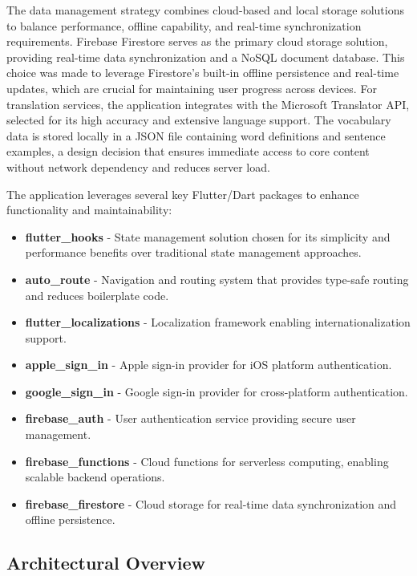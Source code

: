 The data management strategy combines cloud-based and local storage solutions to balance performance, offline capability, and real-time synchronization requirements. Firebase Firestore serves as the primary cloud storage solution, providing real-time data synchronization and a NoSQL document database. This choice was made to leverage Firestore's built-in offline persistence and real-time updates, which are crucial for maintaining user progress across devices. For translation services, the application integrates with the Microsoft Translator API, selected for its high accuracy and extensive language support. The vocabulary data is stored locally in a JSON file containing word definitions and sentence examples, a design decision that ensures immediate access to core content without network dependency and reduces server load.

The application leverages several key Flutter/Dart packages to enhance functionality and maintainability:
\begin{itemize}
    \item \textbf{flutter\_hooks} - State management solution chosen for its simplicity and performance benefits over traditional state management approaches.
    \item \textbf{auto\_route} - Navigation and routing system that provides type-safe routing and reduces boilerplate code.
    \item \textbf{flutter\_localizations} - Localization framework enabling internationalization support.
    \item \textbf{apple\_sign\_in} - Apple sign-in provider for iOS platform authentication.
    \item \textbf{google\_sign\_in} - Google sign-in provider for cross-platform authentication.
    \item \textbf{firebase\_auth} - User authentication service providing secure user management.
    \item \textbf{firebase\_functions} - Cloud functions for serverless computing, enabling scalable backend operations.
    \item \textbf{firebase\_firestore} - Cloud storage for real-time data synchronization and offline persistence.
\end{itemize}

\subsection{Architectural Overview}

